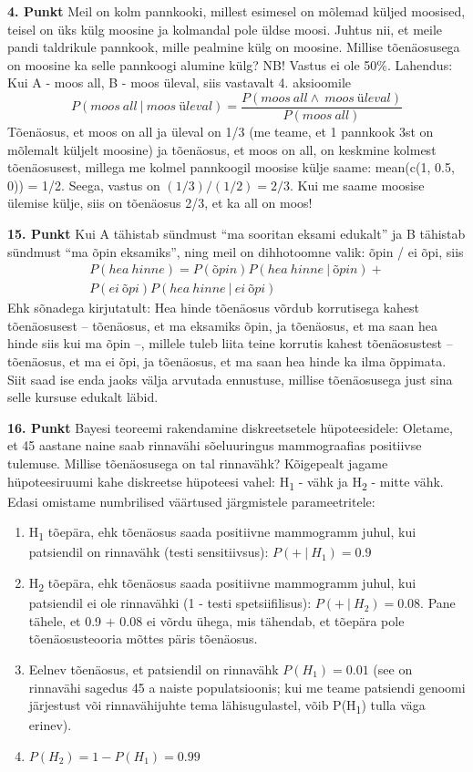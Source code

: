 \documentclass[]{book}
\begin{document}
\textbf{4. Punkt} Meil on kolm pannkooki, millest esimesel on mõlemad küljed moosised, teisel on üks külg moosine ja kolmandal pole üldse moosi. Juhtus nii, et meile pandi taldrikule pannkook, mille pealmine külg on moosine. Millise tõenäosusega on moosine ka selle pannkoogi alumine külg? NB! Vastus ei ole 50\%. Lahendus: Kui A - moos all, B - moos üleval, siis vastavalt 4. aksioomile \[P(moos~ all~ \lvert ~moos~üleval ) = \frac{P(moos~all \land ~moos~üleval)}{P(moos~all)}\]
Tõenäosus, et moos on all ja üleval on 1/3 (me teame, et 1 pannkook 3st on mõlemalt küljelt moosine) ja tõenäosus, et moos on all, on keskmine kolmest tõenäosusest, millega me kolmel pannkoogil moosise külje saame: mean(c(1, 0.5, 0)) = 1/2. Seega, vastus on \((1/3)/(1/2) = 2/3\). Kui me saame moosise ülemise külje, siis on tõenäosus 2/3, et ka all on moos!

\textbf{15. Punkt} Kui A tähistab sündmust ``ma sooritan eksami edukalt'' ja B tähistab sündmust ``ma õpin eksamiks'', ning meil on dihhotoomne valik: õpin / ei õpi, siis \[\begin{array}{lcl} P(hea~hinne) = P(õpin)P(hea~hinne~ \lvert ~õpin) + \\P(ei~ õpi)P(hea~hinne~ \lvert ~ei~õpi) \end{array}\] Ehk sõnadega kirjutatult: Hea hinde tõenäosus võrdub korrutisega kahest tõenäosusest -- tõenäosus, et ma eksamiks õpin, ja tõenäosus, et ma saan hea hinde siis kui ma õpin --, millele tuleb liita teine korrutis kahest tõenäosustest -- tõenäosus, et ma ei õpi, ja tõenäosus, et ma saan hea hinde ka ilma õppimata. Siit saad ise enda jaoks välja arvutada ennustuse, millise tõenäosusega just sina selle kursuse edukalt läbid.

\textbf{16. Punkt} Bayesi teoreemi rakendamine diskreetsetele hüpoteesidele:
Oletame, et 45 aastane naine saab rinnavähi sõeluuringus mammograafias positiivse tulemuse. Millise tõenäosusega on tal rinnavähk? Kõigepealt jagame hüpoteesiruumi kahe diskreetse hüpoteesi vahel: H\textsubscript{1} - vähk ja H\textsubscript{2} - mitte vähk. Edasi omistame numbrilised väärtused järgmistele parameetritele:

\begin{enumerate}
\def\labelenumi{\arabic{enumi}.}
\item
  H\textsubscript{1} tõepära, ehk tõenäosus saada positiivne mammogramm juhul, kui patsiendil on rinnavähk (testi sensitiivsus): \(P( +~\vert~H_1) = 0.9\)
\item
  H\textsubscript{2} tõepära, ehk tõenäosus saada positiivne mammogramm juhul, kui patsiendil ei ole rinnavähki (1 - testi spetsiifilisus): \(P( +~\vert~H_2) = 0.08\). Pane tähele, et 0.9 + 0.08 ei võrdu ühega, mis tähendab, et tõepära pole tõenäosusteooria mõttes päris tõenäosus.
\item
  Eelnev tõenäosus, et patsiendil on rinnavähk \(P(H_1) = 0.01\) (see on rinnavähi sagedus 45 a naiste populatsioonis; kui me teame patsiendi genoomi järjestust või rinnavähijuhte tema lähisugulastel, võib P(H\textsubscript{1}) tulla väga erinev).
\item
  \(P(H_2) = 1 - P(H_1) = 0.99\)
\end{enumerate}
\end{document}
